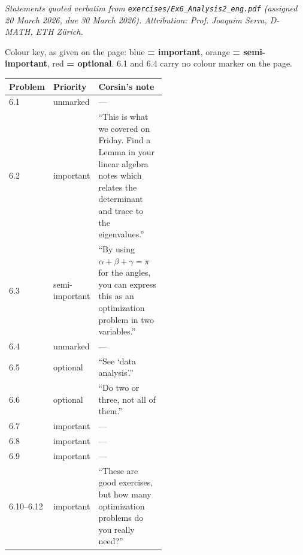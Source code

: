 \begin{center}
\end{center}


\textit{Statements quoted verbatim from \texttt{exercises/Ex6\_Analysis2\_eng.pdf} (assigned 20
March 2026, due 30 March 2026). Attribution: Prof. Joaquim Serra, D-MATH, ETH Z\"urich.}

\begin{ainote}
Colour key, as given on the page: blue \textbf{= important}, orange \textbf{= semi-important},
red \textbf{= optional}. 6.1 and 6.4 carry no colour marker on the page.

\begin{center}
\begin{tabular}{@{}l l p{0.52\linewidth}@{}}
\textbf{Problem} & \textbf{Priority} & \textbf{Corsin's note} \\
\hline
6.1 & unmarked & --- \\[3pt]
6.2 & important & ``This is what we covered on Friday. Find a Lemma in your linear algebra
  notes which relates the determinant and trace to the eigenvalues.'' \\[3pt]
6.3 & semi-important & ``By using $\alpha+\beta+\gamma=\pi$ for the angles, you can express
  this as an optimization problem in two variables.'' \\[3pt]
6.4 & unmarked & --- \\[3pt]
6.5 & optional & ``See `data analysis'.'' \\[3pt]
6.6 & optional & ``Do two or three, not all of them.'' \\[3pt]
6.7 & important & --- \\[3pt]
6.8 & important & --- \\[3pt]
6.9 & important & --- \\[3pt]
6.10--6.12 & important & ``These are good exercises, but how many optimization problems do
  you really need?'' \\
\end{tabular}
\end{center}
\end{ainote}

